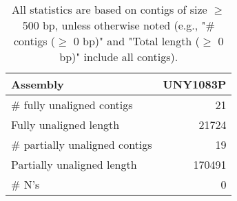 \documentclass[12pt,a4paper]{article}
\begin{document}
\begin{table}[ht]
\begin{center}
\caption{All statistics are based on contigs of size $\geq$ 500 bp, unless otherwise noted (e.g., "\# contigs ($\geq$ 0 bp)" and "Total length ($\geq$ 0 bp)" include all contigs).}
\begin{tabular}{|l*{1}{|r}|}
\hline
Assembly & UNY1083P \\ \hline
\# fully unaligned contigs & 21 \\ \hline
Fully unaligned length & 21724 \\ \hline
\# partially unaligned contigs & 19 \\ \hline
Partially unaligned length & 170491 \\ \hline
\# N's & 0 \\ \hline
\end{tabular}
\end{center}
\end{table}
\end{document}

